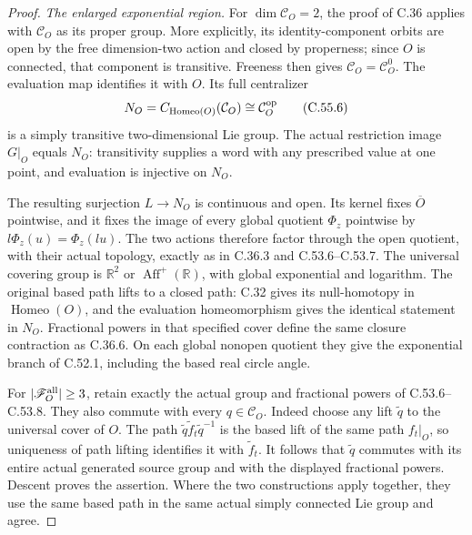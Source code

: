 \begin{proof}
\emph{The enlarged exponential region.}
For $\dim\mathcal C_O=2$, the proof of C.36 applies with
$\mathcal C_O$ as its proper group. More explicitly, its
identity-component orbits are open by the free
dimension-two action and closed by properness; since
$O$ is connected, that component is transitive. Freeness
then gives $\mathcal C_O=\mathcal C_O^0$. The evaluation
map identifies it with $O$. Its full centralizer
\[
 N_O=C_{\operatorname{Homeo}(O)}(\mathcal C_O)
                            \cong\mathcal C_O^{\rm op}
                                                        \tag{C.55.6}
\]
is a simply transitive two-dimensional Lie group.
The actual restriction image $G|_O$ equals $N_O$:
transitivity supplies a word with any prescribed value
at one point, and evaluation is injective on $N_O$.

The resulting surjection $L\to N_O$ is continuous and
open. Its kernel fixes $\overline O$ pointwise, and it
fixes the image of every global quotient $\Phi_z$
pointwise by $l\Phi_z(u)=\Phi_z(lu)$. The two actions
therefore factor through the open quotient, with their
actual topology, exactly as in C.36.3 and C.53.6--C.53.7.
The universal covering group is $\mathbb R^2$ or
$\operatorname{Aff}^+(\mathbb R)$, with global exponential
and logarithm. The original based path lifts to a
closed path: C.32 gives its null-homotopy in
$\operatorname{Homeo}(O)$, and the evaluation
homeomorphism gives the identical statement in $N_O$.
Fractional powers in that specified cover define the
same closure contraction as C.36.6. On each global
nonopen quotient they give the exponential branch of
C.52.1, including the based real circle angle.

For $|\mathscr F_O^{\rm all}|\geq3$, retain exactly the
actual group and fractional powers of C.53.6--C.53.8.
They also commute with every $q\in\mathcal C_O$.
Indeed choose any lift $\widetilde q$ to the universal
cover of $O$. The path
$\widetilde q\widetilde f_t\widetilde q^{-1}$ is the
based lift of the same path $f_t|_O$, so uniqueness of
path lifting identifies it with $\widetilde f_t$.
It follows that $\widetilde q$ commutes with its entire
actual generated source group and with the displayed
fractional powers. Descent proves the assertion.
Where the two constructions apply together, they
use the same based path in the same actual simply
connected Lie group and agree.


\end{proof}
